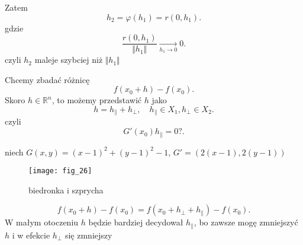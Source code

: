 \documentclass[../main.tex]{subfiles}
\begin{document}
Zatem
\[
    h_2 = \varphi(h_1) = r(0,h_1)
.\] gdzie \[
\frac{r(0,h_1)}{\Vert h_1 \Vert} \underset{h_1 \to 0}{\to} 0
.\]
czyli $h_2$ maleje szybciej niż $\Vert h_1 \Vert$

Chcemy zbadać różnicę \[
    f(x_0+h) - f(x_0)
.\] Skoro $h\in \mathbb{R}^n$, to możemy przedstawić $h$ jako \[
h = h_{\parallel} + h_{\perp},\quad h_{\parallel} \in X_1, h_{\perp} \in X_2
.\]
czyli \[
    G'(x_0)h_{\parallel} = 0?
.\]

\begin{przyklad}
    niech $G(x,y) = (x-1)^2 + (y-1)^2 - 1$,  $G' = (2(x-1),2(y-1))$
    \begin{figure}[h]
        \centering
        \texttt{[image: fig\_26]}
        \caption{biedronka i szprycha}
        \label{fig:fig_26}
    \end{figure}
\end{przyklad}

\[
    f(x_0+h) - f(x_0) = f(x_0 + h_\perp + h_\parallel) - f(x_0)
.\]
W małym otoczeniu $h$ będzie bardziej decydował $h_\parallel$, bo zawsze mogę zmniejszyć $h$ i w efekcie $h_\perp$ się zmniejszy
\end{document}
